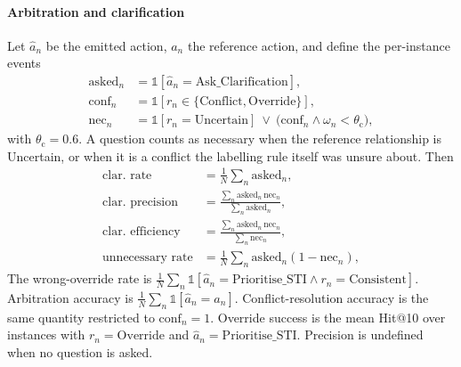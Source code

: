 \paragraph{Arbitration and clarification}
Let $\hat{a}_n$ be the emitted action, $a_n$ the reference action, and define the per-instance events
\begin{align}
  \mathrm{asked}_n &= \mathbb{1}[\hat{a}_n=\text{Ask\_Clarification}], \nonumber\\
  \mathrm{conf}_n &= \mathbb{1}[r_n\in\{\text{Conflict},\text{Override}\}], \nonumber\\
  \mathrm{nec}_n &= \mathbb{1}[r_n=\text{Uncertain}]\ \vee\ \big(\mathrm{conf}_n\wedge\omega_n<\theta_{\mathrm{c}}\big), \label{eq:necessary}
\end{align}
with $\theta_{\mathrm{c}}=0.6$. A question counts as necessary when the reference relationship is Uncertain, or when it is a conflict the labelling rule itself was unsure about. Then
\begin{align}
  \text{clar.\ rate} &= \tfrac{1}{N}\textstyle\sum_n\mathrm{asked}_n, \nonumber\\
  \text{clar.\ precision} &= \frac{\sum_n\mathrm{asked}_n\,\mathrm{nec}_n}{\sum_n\mathrm{asked}_n}, \nonumber\\
  \text{clar.\ efficiency} &= \frac{\sum_n\mathrm{asked}_n\,\mathrm{nec}_n}{\sum_n\mathrm{nec}_n}, \nonumber\\
  \text{unnecessary rate} &= \tfrac{1}{N}\textstyle\sum_n\mathrm{asked}_n(1-\mathrm{nec}_n), \label{eq:clar}
\end{align}
The wrong-override rate is $\tfrac{1}{N}\sum_n\mathbb{1}[\hat{a}_n=\text{Prioritise\_STI}\wedge r_n=\text{Consistent}]$. Arbitration accuracy is $\tfrac{1}{N}\sum_n\mathbb{1}[\hat{a}_n=a_n]$. Conflict-resolution accuracy is the same quantity restricted to $\mathrm{conf}_n=1$. Override success is the mean Hit@10 over instances with $r_n=\text{Override}$ and $\hat{a}_n=\text{Prioritise\_STI}$. Precision is undefined when no question is asked.

